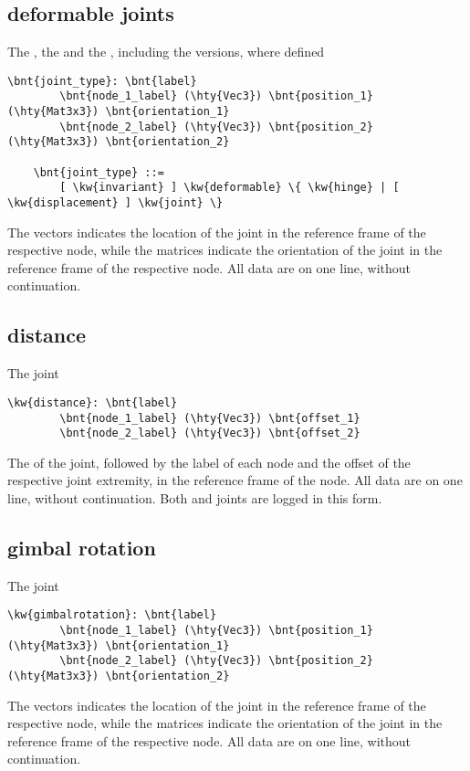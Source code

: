 \subsection{deformable joints}
The , the 
and the , including the 
versions, where defined
\begin{Verbatim}[commandchars=\\\{\}]
    \bnt{joint_type}: \bnt{label}
        \bnt{node_1_label} (\hty{Vec3}) \bnt{position_1} (\hty{Mat3x3}) \bnt{orientation_1}
        \bnt{node_2_label} (\hty{Vec3}) \bnt{position_2} (\hty{Mat3x3}) \bnt{orientation_2}

    \bnt{joint_type} ::=
        [ \kw{invariant} ] \kw{deformable} \{ \kw{hinge} | [ \kw{displacement} ] \kw{joint} \}
\end{Verbatim}
The  vectors indicates the location of the joint
in the reference frame of the respective node,
while the  matrices indicate the orientation of the joint
in the reference frame of the respective node.
All data are on one line, without continuation.

\subsection{distance}
The  joint
\begin{Verbatim}[commandchars=\\\{\}]
    \kw{distance}: \bnt{label}
        \bnt{node_1_label} (\hty{Vec3}) \bnt{offset_1}
        \bnt{node_2_label} (\hty{Vec3}) \bnt{offset_2}
\end{Verbatim}
The  of the joint, followed by the label of each node
and the offset of the respective joint extremity,
in the reference frame of the node.
All data are on one line, without continuation.
Both  and  joints are logged
in this form.

\subsection{gimbal rotation}
The  joint
\begin{Verbatim}[commandchars=\\\{\}]
    \kw{gimbalrotation}: \bnt{label}
        \bnt{node_1_label} (\hty{Vec3}) \bnt{position_1} (\hty{Mat3x3}) \bnt{orientation_1}
        \bnt{node_2_label} (\hty{Vec3}) \bnt{position_2} (\hty{Mat3x3}) \bnt{orientation_2}
\end{Verbatim}
The  vectors indicates the location of the joint
in the reference frame of the respective node,
while the  matrices indicate the orientation of the joint
in the reference frame of the respective node.
All data are on one line, without continuation.

